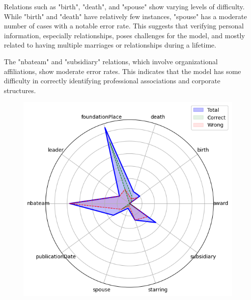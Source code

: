 Relations such as "birth", "death", and "spouse" show varying levels of difficulty.
While "birth" and "death" have relatively few instances, "spouse" has a moderate number of cases with a notable error rate.
This suggests that verifying personal information, especially relationships, poses challenges for the model, and mostly related to having multiple marriages or relationships during a lifetime.

The "nbateam" and "subsidiary" relations, which involve organizational affiliations, show moderate error rates.
This indicates that the model has some difficulty in correctly identifying professional associations and corporate structures.

\begin{figure}[ht!]
    \centering
    \begin{minipage}[b]{0.4\textwidth}
        \centering
        \includegraphics[width=\textwidth]{res/radar-error-0}
    \end{minipage}
    \hspace{0.05\textwidth} %
    \begin{minipage}[b]{0.4\textwidth}
        \centering

\end{minipage}
\end{figure}
